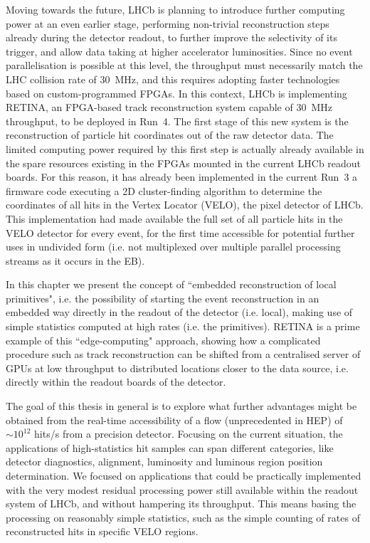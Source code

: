 Moving towards the future, LHCb is planning to introduce further computing power at an even earlier stage, performing non-trivial reconstruction steps already during the detector readout, to further improve the selectivity of its trigger, and allow data taking at higher accelerator luminosities. 
Since no event parallelisation is possible at this level, the throughput must necessarily match the LHC collision rate of \SI{30}{\mega\hertz}, and this requires adopting faster technologies based on custom-programmed FPGAs.
In this context, LHCb is implementing RETINA, an FPGA-based track reconstruction system capable of \SI{30}{\mega\hertz} throughput, to be deployed in Run~4\cite{Morello:2888549}.  The first stage of this new system is the reconstruction of particle hit coordinates out of the raw detector data. The limited computing power required by this first step is actually already available in the spare resources existing in the FPGAs mounted in the current LHCb readout boards. For this reason, it has already been implemented in the current Run~3 a firmware code executing a 2D cluster-finding algorithm to determine the coordinates of all hits in the Vertex Locator (VELO), the pixel detector of LHCb. 
This implementation had made available the full set of all particle hits in the VELO detector for every event, for the first time accessible for potential further uses in undivided form (i.e. not multiplexed over multiple parallel processing streams as it occurs in the EB).

In this chapter we present the concept of ``embedded reconstruction of local primitives", i.e. the possibility of starting the event reconstruction in an embedded way directly in the readout of the detector (i.e. local), making use of simple statistics computed at high rates (i.e. the primitives). RETINA is a prime example of this ``edge-computing"  approach, showing how a complicated procedure such as track reconstruction can be shifted from a centralised server of GPUs at low throughput to distributed locations closer to the data source, i.e. directly within the readout boards of the detector.

The goal of this thesis in general is to explore what further advantages might be obtained from the real-time accessibility of a flow (unprecedented in HEP) of $\sim 10^{12}$ hits/s from a precision detector. Focusing on the current situation, the applications of high-statistics hit samples can span different categories, like detector diagnostics, alignment, luminosity and luminous region position determination. 
We focused on applications that could be practically implemented with the very modest residual processing power still available within the readout system of LHCb, and without hampering its throughput. This means basing the processing on reasonably simple statistics, such as the simple counting of rates of reconstructed hits in specific VELO regions.

